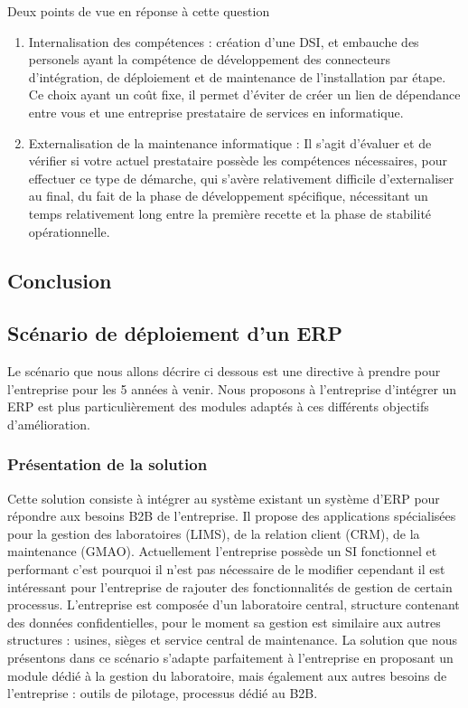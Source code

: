 Deux points de vue en réponse à cette question\\
\begin{enumerate}
\item Internalisation des compétences : création d'une DSI, et embauche des personels ayant la compétence de développement des connecteurs d'intégration, de déploiement et de maintenance de l'installation par étape. Ce choix ayant un coût fixe, il permet d'éviter de créer un lien de dépendance entre vous et une entreprise prestataire de services en informatique.
\item Externalisation de la maintenance informatique : Il s'agit d'évaluer et de vérifier si votre actuel prestataire possède les compétences nécessaires, pour effectuer ce type de démarche, qui s'avère relativement difficile d'externaliser au final, du fait de la phase de développement spécifique, nécessitant un temps relativement long entre la première recette et la phase de stabilité opérationnelle.
\end{enumerate}

\subsection{Conclusion}


\subsection{Scénario de déploiement d'un ERP}
Le scénario que nous allons décrire ci dessous est une directive à prendre pour l'entreprise pour les 5 années à venir. Nous proposons à l'entreprise d'intégrer un ERP est plus particulièrement des modules adaptés à ces différents objectifs d'amélioration. 
\subsubsection{Présentation de la solution}
Cette solution consiste à intégrer au système existant un système d'ERP pour répondre aux besoins B2B de l'entreprise. Il propose des applications spécialisées pour la gestion des laboratoires (LIMS), de la relation client (CRM), de la maintenance (GMAO). Actuellement l'entreprise possède un SI fonctionnel et performant c'est pourquoi il n'est pas nécessaire de le modifier cependant il est intéressant pour l'entreprise de rajouter des fonctionnalités de gestion de certain processus. L'entreprise est composée d'un laboratoire central, structure contenant des données confidentielles, pour le moment sa gestion est similaire aux autres structures : usines, sièges et service central de maintenance. La solution que nous présentons dans ce scénario s'adapte parfaitement à l'entreprise en proposant un module dédié à la gestion du laboratoire, mais également aux autres besoins de l'entreprise : outils de pilotage, processus dédié au B2B.   
